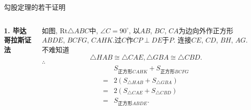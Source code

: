 \documentclass[serif]{beamer}
\begin{document}
\begin{frame}{\heiti 勾股定理的若干证明}

	\begin{columns}
		\column{6.5cm}
		\textbf{1. 毕达哥拉斯证法}\par
		如图, $\mathrm{Rt}\triangle ABC$中, $\angle C=90^\circ$, 以$AB$, $BC$, $CA$为边向外作正方形$ABDE$, $BCFG$, $CAHK$.过$C$作$CP\perp DE$于$P$. 连接$CE$, $CD$, $BH$, $AG$.不难知道
		\[\triangle HAB\cong\triangle CAE, \triangle GBA\cong\triangle CBD.\]
		$\therefore$
		\vspace*{-0.65cm}
		\begin{align*}
		 	&S_{\text{正方形}CAHK}+S_{\text{正方形}BCFG}\\
			=&2\left(S_{\triangle HAB}+S_{\triangle GBA}\right)\\
			=&2\left(S_{\triangle CAE}+S_{\triangle CBD}\right)\\
			=&S_{\text{正方形}ABDE}.
		\end{align*}
		

\end{columns}
\end{frame}
\end{document}
